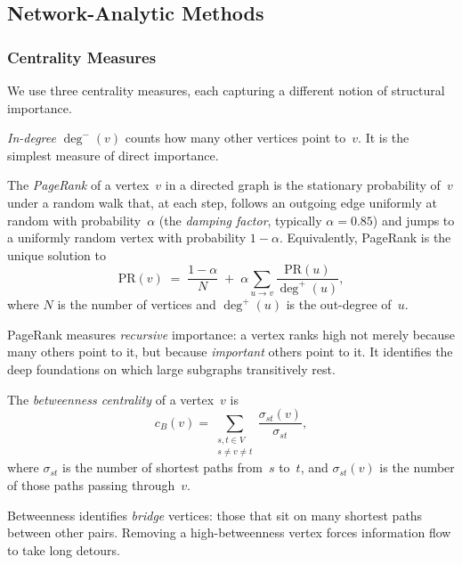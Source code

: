 \subsection{Network-Analytic Methods}
\label{sec:prelim-network}

\subsubsection{Centrality Measures}
\label{sec:prelim-centrality}

We use three centrality measures, each capturing a different notion of structural importance.

\emph{In-degree} $\deg^{-}(v)$ counts how many other vertices point to~$v$. It is the simplest measure of direct importance.

\begin{definition}
\label{def:pagerank}
The \emph{PageRank} of a vertex~$v$ in a directed graph is the stationary probability of~$v$ under a random walk that, at each step, follows an outgoing edge uniformly at random with probability~$\alpha$ (the \emph{damping factor}, typically $\alpha = 0.85$) and jumps to a uniformly random vertex with probability $1 - \alpha$.  Equivalently, PageRank is the unique solution to
\[
  \mathrm{PR}(v) \;=\; \frac{1-\alpha}{N} \;+\; \alpha \sum_{u \to v} \frac{\mathrm{PR}(u)}{\deg^{+}(u)},
\]
where $N$ is the number of vertices and $\deg^{+}(u)$ is the out-degree of~$u$.
\end{definition}

PageRank measures \emph{recursive} importance: a vertex ranks high not merely because many others point to it, but because \emph{important} others point to it. It identifies the deep foundations on which large subgraphs transitively rest.

\begin{definition}
\label{def:betweenness}
The \emph{betweenness centrality} of a vertex~$v$ is
\[
  c_B(v) = \sum_{\substack{s, t \in V \\ s \ne v \ne t}} \frac{\sigma_{st}(v)}{\sigma_{st}},
\]
where $\sigma_{st}$ is the number of shortest paths from~$s$ to~$t$, and $\sigma_{st}(v)$ is the number of those paths passing through~$v$.
\end{definition}

Betweenness identifies \emph{bridge} vertices: those that sit on many shortest paths between other pairs. Removing a high-betweenness vertex forces information flow to take long detours.

